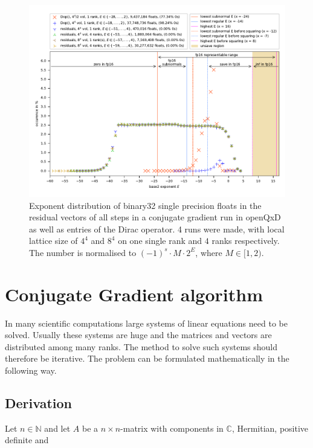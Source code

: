 \documentclass{article}
\theoremstyle{plain} %
\theoremstyle{convention} %
\theoremstyle{remark} %
\numberwithin{equation}{section}
\begin{document}
\begin{figure}
    \centering
    \includegraphics[width=1.0\textwidth]{plots/exponents_dirac}
    \caption{Exponent distribution of \gls{binary32} single precision floats in the residual vectors of all steps in a conjugate gradient run in openQxD as well as entries of the Dirac operator. 4 runs were made, with local lattice size of $4^4$ and $8^4$ on one single rank and $4$ ranks respectively. The number is normalised to $(-1)^s \cdot M \cdot 2^{E}$, where $M \in [1, 2)$.}
    \label{fig:exponents}
\end{figure}


\section{Conjugate Gradient algorithm}

\label{sec:cg}

In many scientific computations large systems of linear equations need to be solved. Usually these systems are huge and the matrices and vectors are distributed among many \glspl{rank}. The method to solve such systems should therefore be iterative. The problem can be formulated mathematically in the following way.

\subsection{Derivation}

Let $n \in \mathbb{N}$ and let $A$ be a $n \times n$-matrix with components in $\mathbb{C}$, Hermitian, positive definite and 
\end{document}
